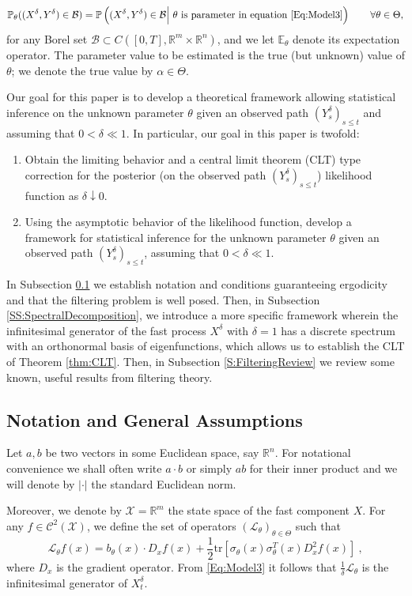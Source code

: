 \documentclass{article}
\begin{document}
\[\mathbb P_\theta((X^\delta,Y^\delta)\in\mathcal B) = \mathbb P\left((X^\delta,Y^\delta)\in\mathcal B\Big|~\hbox{$\theta$ is parameter in equation \eqref{Eq:Model3}}\right)\qquad\forall\theta\in\Theta ,\]
for any Borel set $\mathcal B\subset C([0,T],\mathbb R^m\times\mathbb R^n)$, and we let $\mathbb E_\theta$ denote its expectation operator. The parameter value to be estimated is the true (but unknown) value of $\theta$; we denote the true value by $\alpha\in\Theta$.

Our goal for this paper is to develop a theoretical framework allowing statistical inference on the unknown parameter  $\theta$ given an observed path $(Y_s^\delta)_{s\leq t}$ and assuming that $0<\delta\ll 1$. In particular, our goal in this paper is twofold:
\begin{enumerate}
\item{Obtain the limiting behavior and a central limit theorem (CLT) type correction for the posterior (on the observed path $(Y_s^\delta)_{s\leq t}$) likelihood function as $\delta\downarrow 0$.}
\item{Using the asymptotic behavior of the likelihood function, develop a framework for statistical inference for the unknown parameter $\theta$ given an observed path $(Y_s^\delta)_{s\leq t}$, assuming that $0<\delta\ll 1$.}
\end{enumerate}

In Subsection \ref{SS:coefficients} we establish notation and conditions guaranteeing ergodicity and that the filtering problem is well posed. Then, in Subsection \ref{SS:SpectralDecomposition}, we introduce a more specific framework wherein the infinitesimal generator of the fast process $X^{\delta}$ with $\delta=1$ has a discrete spectrum with an orthonormal basis of eigenfunctions, which allows us to establish the CLT of Theorem \ref{thm:CLT}. Then, in Subsection \ref{S:FilteringReview} we review some known, useful results from filtering theory.

\subsection{Notation and General Assumptions}\label{SS:coefficients}
Let $a,b$ be two vectors in some Euclidean space, say $\mathbb{R}^{n}$. For notational convenience we shall often write $a\cdot b$ or simply $ab$ for their inner product and we will denote by $|\cdot|$ the standard Euclidean norm.

Moreover, we denote by $\mathcal{X}=\mathbb{R}^{m}$ the state space of the fast component $X$. For any $f\in\mathcal{C}^{2}(\mathcal{X})$, we define the set of operators $\left(\mathcal L_\theta\right)_{\theta\in\Theta}$ such that
\begin{equation}
\mathcal{L}_\theta f(x)=b_\theta(x)\cdot D_{x}f(x)+\frac{1}{2}\textrm{tr}\left[\sigma_\theta(x)\sigma_\theta^{T}(x)D^{2}_{x}f(x) \right]\ ,
\end{equation}
where $D_x$ is the gradient operator. From \eqref{Eq:Model3} it follows that $\frac 1\delta\mathcal L_\theta$ is the infinitesimal generator of $X_t^\delta$.
\end{document}

